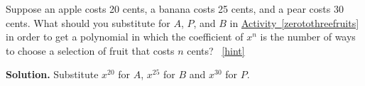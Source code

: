 \documentclass{book}
\begin{document}
\setcounter{project}{242}
\addtocounter{project}{-1}
\begin{activity}[]\label{activity-235}
\hypertarget{p-1339}{}%
Suppose an apple costs 20 cents, a banana costs 25 cents, and a pear costs 30 cents. What should you substitute for \(A\), \(P\), and \(B\) in \hyperref[zerotothreefruits]{Activity~\ref{zerotothreefruits}} in order to get a polynomial in which the coefficient of \(x^n\) is the number of ways to choose a selection of fruit that costs \(n\) cents?%
~\hfill{\tiny\hyperlink{a-242}{[hint]}\hypertarget{q-242}{}}\par\smallskip%
\noindent\textbf{Solution.}\hypertarget{solution-177}{}\quad%
\hypertarget{p-1341}{}%
Substitute \(x^{20}\) for \(A\), \(x^{25}\) for \(B\) and \(x^{30}\) for \(P\).%
\end{activity}
\end{document}
